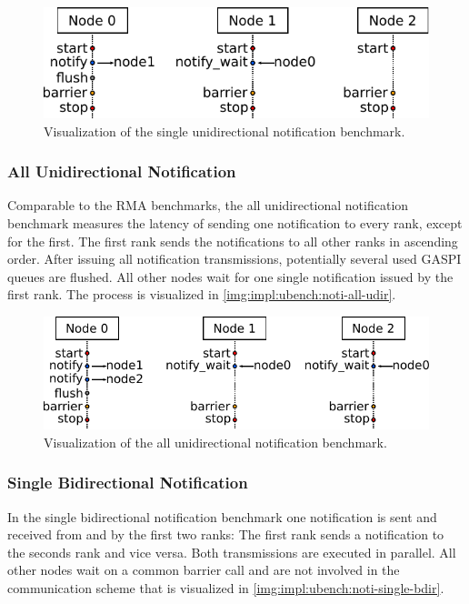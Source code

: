 \begin{figure}[htb]
\centering
\includegraphics[width=\textwidth]{img/bench-noti-single-udir}
\caption{Visualization of the single unidirectional notification benchmark.}
\label{img:impl:ubench:noti-single-udir}
\end{figure}


\subsubsection*{All Unidirectional Notification}

Comparable to the \ac{RMA} benchmarks, the all unidirectional notification benchmark measures the latency of sending one notification to every rank, except for the first. The first rank sends the notifications to all other ranks in ascending order. After issuing all notification transmissions, potentially several used \ac{GASPI} queues are flushed. All other nodes wait for one single notification issued by the first rank. The process is visualized in \autoref{img:impl:ubench:noti-all-udir}.

\begin{figure}[htb]
\centering
\includegraphics[width=\textwidth]{img/bench-noti-all-udir}
\caption{Visualization of the all unidirectional notification benchmark.}
\label{img:impl:ubench:noti-all-udir}
\end{figure}


\subsubsection*{Single Bidirectional Notification}

In the single bidirectional notification benchmark one notification is sent and received from and by the first two ranks: The first rank sends a notification to the seconds rank and vice versa. Both transmissions are executed in parallel. All other nodes wait on a common barrier call and are not involved in the communication scheme that is visualized in \autoref{img:impl:ubench:noti-single-bdir}.

